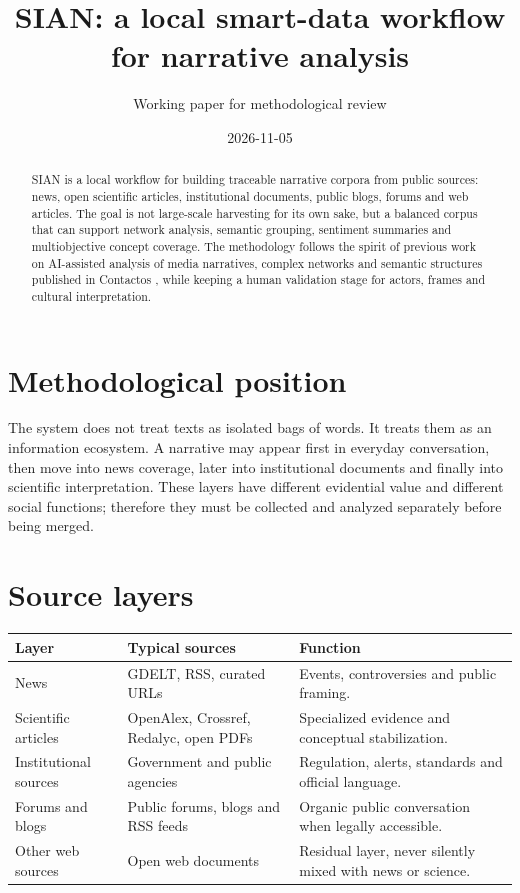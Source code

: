 \documentclass[11pt]{article}
\title{SIAN: a local smart-data workflow for narrative analysis}
\author{Working paper for methodological review}
\date{2026-11-05}
\begin{document}
\maketitle

\begin{abstract}
SIAN is a local workflow for building traceable narrative corpora from public sources: news, open scientific articles, institutional documents, public blogs, forums and web articles. The goal is not large-scale harvesting for its own sake, but a balanced corpus that can support network analysis, semantic grouping, sentiment summaries and multiobjective concept coverage. The methodology follows the spirit of previous work on AI-assisted analysis of media narratives, complex networks and semantic structures published in Contactos \cite{contactos625}, while keeping a human validation stage for actors, frames and cultural interpretation.
\end{abstract}

\section{Methodological position}

The system does not treat texts as isolated bags of words. It treats them as an information ecosystem. A narrative may appear first in everyday conversation, then move into news coverage, later into institutional documents and finally into scientific interpretation. These layers have different evidential value and different social functions; therefore they must be collected and analyzed separately before being merged.

\section{Source layers}

\begin{center}
\begin{tabular}{p{3cm}p{4cm}p{6cm}}
\toprule
Layer & Typical sources & Function\\
\midrule
News & GDELT, RSS, curated URLs & Events, controversies and public framing.\\
Scientific articles & OpenAlex, Crossref, Redalyc, open PDFs & Specialized evidence and conceptual stabilization.\\
Institutional sources & Government and public agencies & Regulation, alerts, standards and official language.\\
Forums and blogs & Public forums, blogs and RSS feeds & Organic public conversation when legally accessible.\\
Other web sources & Open web documents & Residual layer, never silently mixed with news or science.\\
\bottomrule
\end{tabular}
\end{center}
\end{document}
